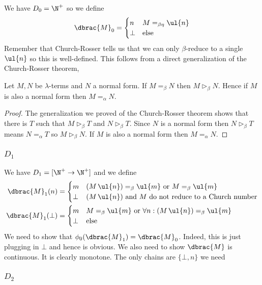 \documentclass[12pt]{article}
\newcommand{\red}{\triangleright}
\newcommand{\bred}{\red_{\beta}}
\begin{document}
We have $D_0 = \N^+$ so we define
\[ \dbrac{M}_0 = 
\begin{cases}
n & M =_{\beta\eta} \ul{n} 
\\
\bot & \text{else}
\end{cases} \]
Remember that Church-Rosser tells us that we can only $\beta$-reduce to a single $\ul{n}$ so this is well-defined. This follows from a direct generalization of the Church-Rosser theorem,

\begin{lemma}
Let $M, N$ be $\lambda$-terms and $N$ a normal form. If $M =_\beta N$ then $M \bred N$. Hence if $M$ is also a normal form then $M =_{\alpha} N$.
\end{lemma}

\begin{proof}
The generalization we proved of the Church-Rosser theorem shows that there is $T$ such that $M \bred T$ and $N \bred T$. Since $N$ is a normal form then $N \bred T$ means $N =_{\alpha} T$ so $M \bred N$. If $M$ is also a normal form then $M =_{\alpha} N$.
\end{proof}

\subsubsection{$D_1$}

We have $D_1 = [\N^+ \to \N^+]$ and we define
\begin{align*} 
\dbrac{M}_1(n) &= 
\begin{cases}
m & (M \, \ul{n}) =_{\beta} \ul{m} \text{ or } M =_{\beta} \ul{m}
\\
\bot & (M \, \ul{n}) \text{ and } M \text{ do not reduce to a Church number}
\end{cases} 
\\
\dbrac{M}_1(\bot) &= 
\begin{cases}
m & M =_{\beta} \ul{m} \text{ or } \forall n : (M \, \ul{n}) =_{\beta} \ul{m}
\\
\bot & \text{else} 
\end{cases} 
\end{align*}
We need to show that $\phi_0(\dbrac{M}_1) = \dbrac{M}_0$. Indeed, this is just plugging in $\bot$ and hence is obvious. We also need to show $\dbrac{M}$ is continuous. It is clearly monotone. The only chains are $\{ \bot, n \}$ we need 

\subsubsection{$D_2$}
\end{document}
